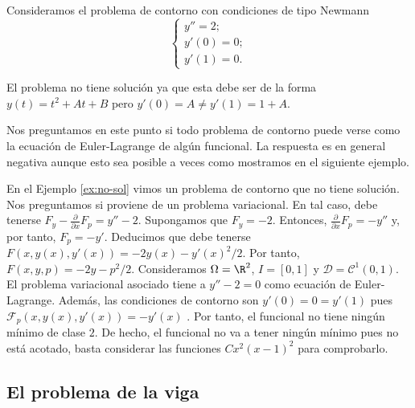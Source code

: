 \documentclass{article}
\begin{document}
\begin{ex} \label{ex:no-sol} Consideramos el problema de contorno con condiciones de tipo Newmann
  \[
    \begin{cases}
      y'' = 2; \\
      y'(0) = 0; \\
      y'(1) = 0.
    \end{cases}
  \]

  El problema no tiene solución ya que esta debe ser de la forma $y(t) = t^2 + A t + B$ pero
  $y'(0) = A \ne y'(1) = 1+A$.
\end{ex}

Nos preguntamos en este punto si todo problema de contorno puede verse como la ecuación de
Euler-Lagrange de algún funcional. La respuesta es en general negativa aunque esto sea posible a
veces como mostramos en el siguiente ejemplo.

\begin{ex} \label{ex:no-sol:2} En el Ejemplo \ref{ex:no-sol} vimos un problema de contorno que no
  tiene solución. Nos preguntamos si proviene de un problema variacional. En tal caso, debe tenerse
  $F_y - \frac{\partial}{\partial x} F_p = y''-2$. Supongamos que $F_y = -2$. Entonces,
  $\frac{\partial}{\partial x} F_p = -y''$ y, por tanto, $F_p = -y'$. Deducimos que debe tenerse
  $F(x,y(x),y'(x)) = -2y(x) - y'(x)^2/2$. Por tanto, $F(x,y,p) = -2y -p^2/2$. Consideramos
  $\Omega = \R^2$, $I = [0,1]$ y $\mathcal{D} = \mathcal{C}^1(0, 1)$. El problema variacional
  asociado tiene a $y'' -2 = 0$ como ecuación de Euler-Lagrange. Además, las condiciones de contorno
  son $y'(0) = 0 = y'(1)$ pues $\mathcal{F}_p(x,y(x),y'(x)) = -y'(x)$ . Por tanto, el funcional no
  tiene ningún mínimo de clase $2$. De hecho, el funcional no va a tener ningún mínimo pues no está
  acotado, basta considerar las funciones $Cx^2(x-1)^2$ para comprobarlo.
\end{ex}


\subsection{El problema de la viga}

\begin{ex}
  
\end{ex}

\begin{ex}
  
\end{ex}
\end{document}
